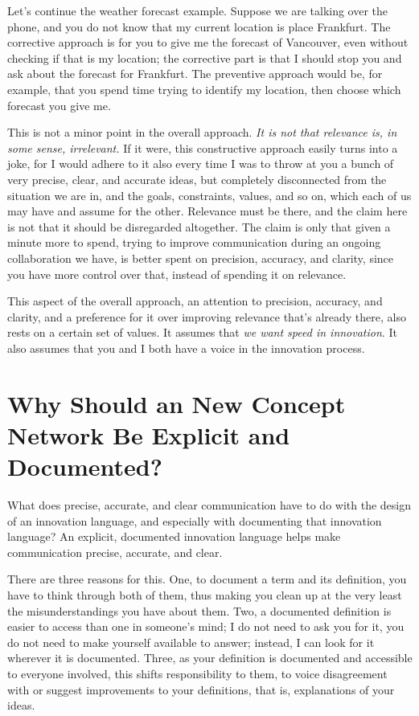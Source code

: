 \documentclass[graybox,envcountchap,sectrefs]{svmono}
\newcommand{\ncnf}{New Concept Network}
\begin{document}
Let's continue the weather forecast example. Suppose we are talking over the phone, and you do not know that my current location is place Frankfurt. The corrective approach is for you to give me the forecast of Vancouver, even without checking if that is my location; the corrective part is that I should stop you and ask about the forecast for Frankfurt. The preventive approach would be, for example, that you spend time trying to identify my location, then choose which forecast you give me. 

This is not a minor point in the overall approach. \textit{It is not that relevance is, in some sense, irrelevant.} If it were, this constructive approach easily turns into a joke, for I would adhere to it also every time I was to throw at you a bunch of very precise, clear, and accurate ideas, but completely disconnected from the situation we are in, and the goals, constraints, values, and so on, which each of us may have and assume for the other. Relevance must be there, and the claim here is not that it should be disregarded altogether. The claim is only that given a minute more to spend, trying to improve communication during an ongoing collaboration we have, is better spent on precision, accuracy, and clarity, since you have more control over that, instead of spending it on relevance.

This aspect of the overall approach, an attention to precision, accuracy, and clarity, and a preference for it over improving relevance that's already there, also rests on a certain set of values. It assumes that \textit{we want speed in innovation}. It also assumes that you and I both have a voice in the innovation process.


\section{Why Should an \ncnf{} Be Explicit and Documented?}
\label{c2:s7}
What does precise, accurate, and clear communication have to do with the design of an innovation language, and especially with documenting that innovation language? An explicit, documented innovation language helps make communication precise, accurate, and clear. 

There are three reasons for this. One, to document a term and its definition, you have to think through both of them, thus making you clean up at the very least the misunderstandings you have about them. Two, a documented definition is easier to access than one in someone's mind; I do not need to ask you for it, you do not need to make yourself available to answer; instead, I can look for it wherever it is documented. Three, as your definition is documented and accessible to everyone involved, this shifts responsibility to them, to voice disagreement with or suggest improvements to your definitions, that is, explanations of your ideas.
\end{document}
